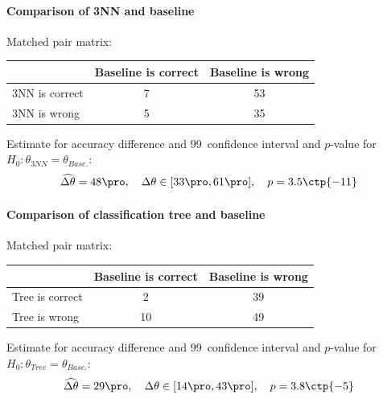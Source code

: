 \documentclass[11pt,fleqn]{article}
\begin{document}
\paragraph{Comparison of 3NN and baseline}
Matched pair matrix:

\begin{table}[H]
	\centering
	\begin{tabular}{l|c c}
		&Baseline is correct& Baseline is wrong \\
		\hline
		3NN is correct &7& 53\\
		3NN is wrong& 5& 35
	\end{tabular}
\end{table}\noindent 
Estimate for accuracy difference and 99\pro\ confidence interval and \(p\)-value for \(H_0: \theta_{3NN}=\theta_{Base.}\):
\[
\widehat{\Delta \theta} = 48\pro,\quad  \Delta \theta\in[33\pro , 61\pro], \quad p = 3.5\ctp{-11}
\]
\paragraph{Comparison of classification tree and baseline}
Matched pair matrix:

\begin{table}[H]
	\centering
	\begin{tabular}{l|c c}
		&Baseline is correct& Baseline is wrong \\
		\hline
		Tree is correct &2& 39\\
		Tree is wrong& 10& 49
	\end{tabular}
\end{table}\noindent 
Estimate for accuracy difference and 99\pro\ confidence interval and \(p\)-value for \(H_0: \theta_{Tree}=\theta_{Base.}\):
\[
\widehat{\Delta \theta} = 29\pro,\quad  \Delta \theta\in[14\pro , 43\pro], \quad p = 3.8\ctp{-5}
\]
\end{document}
